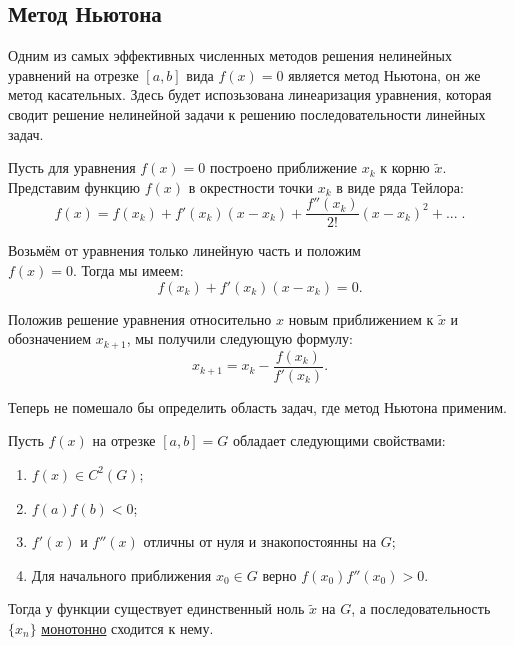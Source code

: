 \documentclass[../main.tex]{subfile}
\begin{document}
\subsection{Метод Ньютона}

Одним из самых эффективных численных методов решения нелинейных уравнений на
отрезке $[a,b]$ вида $f(x)=0$ является метод Ньютона, он же метод касательных.
Здесь будет испозьзована линеаризация уравнения, которая сводит решение
нелинейной задачи к решению последовательности линейных задач.

\begin{algorithm}
	Пусть для уравнения $f(x)=0$ построено приближение $x_k$ к корню
	$\widetilde{x}$. Представим функцию $f(x)$ в окрестности точки $x_k$ в
	виде ряда Тейлора:
	\[f(x)=f(x_k)+f'(x_k)(x-x_k)+\frac{f''(x_k)}{2!}(x-x_k)^2+...\;.\]

	Возьмём от уравнения только линейную часть и положим \\
	$f(x)=0$. Тогда мы имеем:
	\[f(x_k)+f'(x_k)(x-x_k)=0.\]

	Положив решение уравнения относительно $x$ новым приближением к
	$\widetilde{x}$ и обозначением $x_{k+1}$, мы получили следующую формулу:
	\[\boxed{x_{k+1}=x_k-\frac{f(x_k)}{f'(x_k)}.}\]
\end{algorithm}

Теперь не помешало бы определить область задач, где метод Ньютона применим.
\newline

\begin{theorem}
	Пусть $f(x)$ на отрезке $[a,b]=G$ обладает следующими свойствами:
	\begin{enumerate}
		\item $f(x)\in C^2(G)$;
		\item $f(a)f(b)<0$;
		\item $f'(x)$ и $f''(x)$ отличны от нуля и знакопостоянны на $G$;
		\item Для начального приближения $x_0\in G$ верно $f(x_0)f''(x_0)>0$.
	\end{enumerate}

	Тогда у функции существует единственный ноль $\widetilde{x}$ на $G$, а
	последовательность $\{x_n\}$ \underline{монотонно} сходится к нему.
\end{theorem}
\end{document}
